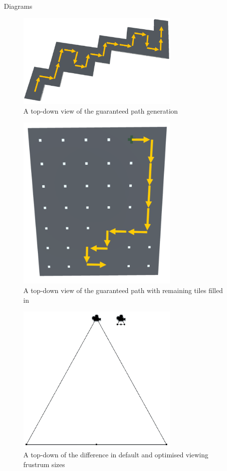 \documentclass[progress]{cmpreport}
\begin{document}
\begin{section}{Diagrams}

\begin{figure}[H]
    \centering
    \includegraphics[width=8cm]{img/1-maze.png}
    \caption{A top-down view of the guaranteed path generation}
    \label{fig:pathgen}
\end{figure}

\begin{figure}[H]
    \centering
    \includegraphics[width=8cm]{img/filled-path.png}
    \caption{A top-down view of the guaranteed path with remaining tiles filled in}
    \label{fig:filledpath}
\end{figure}

\begin{figure}[H]
    \centering
    \includegraphics[width=8cm]{img/frustrums.png}
    \caption{A top-down of the difference in default and optimised viewing frustrum sizes}
    \label{fig:frustrums}
\end{figure}


\end{section}
\end{document}
